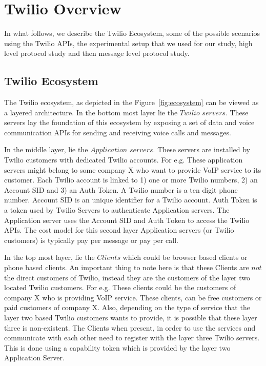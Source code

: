 \section{Twilio Overview}
\label{sec-twilioecoandprotocolstudy}
In what follows, we describe the Twilio Ecosystem, some of the possible scenarios using the Twilio APIs, the experimental setup that we used for our study, high level protocol study and then message level protocol study.
\subsection{Twilio Ecosystem}
\label{subsec-twilioeco}
The Twilio ecosystem, as depicted in the Figure~\ref{fig:ecosystem} can be viewed as a layered architecture. In the bottom most layer lie the $Twilio$  $servers$. These servers lay the foundation of this ecosystem by exposing a set of data and voice communication APIs for sending and receiving voice calls and messages. 

In the middle layer, lie the $Application$ $servers$. These servers are installed by Twilio customers with dedicated Twilio accounts. For e.g. These application servers might belong to some company X who want to provide VoIP service to its customer. Each Twilio account is linked to 1) one or more Twilio numbers, 2) an Account SID and 3) an Auth Token. A Twilio number is a ten digit phone number. Account SID is an unique identifier for a Twilio account. Auth Token is a token used by Twilio Servers to authenticate Application servers. The Application server uses the Account SID and Auth Token to access the Twilio APIs. The cost model for this second layer Application servers (or Twilio customers) is typically pay per message or pay per call. 

In the top most layer, lie the $Clients$ which could be browser based clients or phone based clients. An important thing to note here is that these Clients are $not$ the direct customers of Twilio, instead they are the customers of the layer two located Twilio customers. For e.g. These clients could be the customers of company X who is providing VoIP service. These clients, can be free customers or paid customers of company X. Also, depending on the type of service that the layer two based Twilio customers wants to provide, it is possible that these layer three is non-existent.  The Clients when present, in order to use the services and communicate with each other need to register with the layer three Twilio servers. This is done using a capability token which is provided by the layer two Application Server. 

